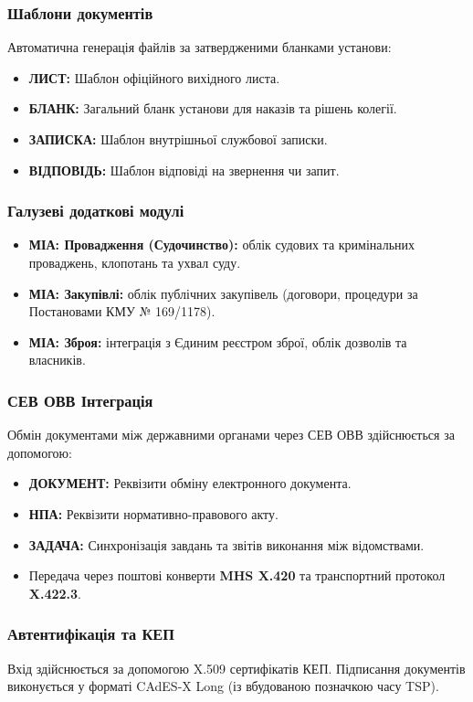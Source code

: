 \documentclass{article}
\begin{document}
\subsubsection{Шаблони документів}
Автоматична генерація файлів за затвердженими бланками установи:
\begin{itemize}
    \item \textbf{ЛИСТ:} Шаблон офіційного вихідного листа.
    \item \textbf{БЛАНК:} Загальний бланк установи для наказів та рішень колегії.
    \item \textbf{ЗАПИСКА:} Шаблон внутрішньої службової записки.
    \item \textbf{ВІДПОВІДЬ:} Шаблон відповіді на звернення чи запит.
\end{itemize}

\subsubsection{Галузеві додаткові модулі}
\begin{itemize}
    \item \textbf{МІА: Провадження (Судочинство):} облік судових та кримінальних проваджень, клопотань та ухвал суду.
    \item \textbf{МІА: Закупівлі:} облік публічних закупівель (договори, процедури за Постановами КМУ № 169/1178).
    \item \textbf{МІА: Зброя:} інтеграція з Єдиним реєстром зброї, облік дозволів та власників.
\end{itemize}

\subsubsection{СЕВ ОВВ Інтеграція}
Обмін документами між державними органами через СЕВ ОВВ здійснюється за допомогою:
\begin{itemize}
    \item \textbf{ДОКУМЕНТ:} Реквізити обміну електронного документа.
    \item \textbf{НПА:} Реквізити нормативно-правового акту.
    \item \textbf{ЗАДАЧА:} Синхронізація завдань та звітів виконання між відомствами.
    \item Передача через поштові конверти \textbf{MHS X.420} та транспортний протокол \textbf{X.422.3}.
\end{itemize}

\subsubsection{Автентифікація та КЕП}
Вхід здійснюється за допомогою X.509 сертифікатів КЕП. Підписання документів виконується у форматі CAdES-X Long (із вбудованою позначкою часу TSP).
\end{document}

